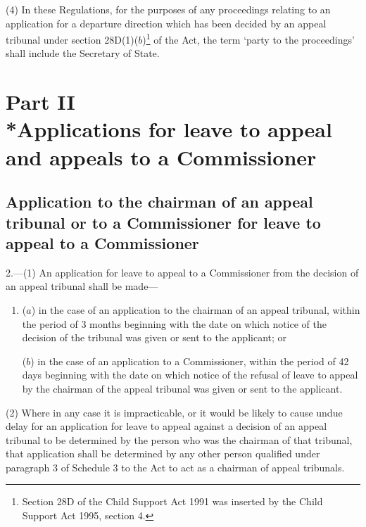 \documentclass[12pt,a4paper]{article}
\begin{document}
(4) In these Regulations, for the purposes of any proceedings relating to an application for a departure direction which has been decided by an appeal tribunal under section 28D(1)($b$)\footnote{\frenchspacing Section 28D of the Child Support Act 1991 was inserted by the Child Support Act 1995, section 4.} of the Act, the term ‘party to the proceedings’ shall include the Secretary of State.


\section[Part II --- Applications for leave to appeal and appeals to a Commissioner]{\sloppy Part II\\*Applications for leave to appeal and appeals to a Commissioner}

\renewcommand\parthead{--- Part II}

\subsection[2. Application to the chairman of an appeal tribunal or to a Commissioner for leave to appeal to a Commissioner]{Application to the chairman of an appeal tribunal or to a Commissioner for leave to appeal to a Commissioner}

2.—(1) An application for leave to appeal to a Commissioner from the decision of an appeal tribunal shall be made—
\begin{enumerate}\item[]
($a$) in the case of an application to the chairman of an appeal tribunal, within the period of 3 months beginning with the date on which notice of the decision of the tribunal was given or sent to the applicant; or

($b$) in the case of an application to a Commissioner, within the period of 42 days beginning with the date on which notice of the refusal of leave to appeal by the chairman of the appeal tribunal was given or sent to the applicant.
\end{enumerate}

(2) Where in any case it is impracticable, or it would be likely to cause undue delay for an application for leave to appeal against a decision of an appeal tribunal to be determined by the person who was the chairman of that tribunal, that application shall be determined by any other person qualified under paragraph 3 of Schedule 3 to the Act to act as a chairman of appeal tribunals.
\end{document}
